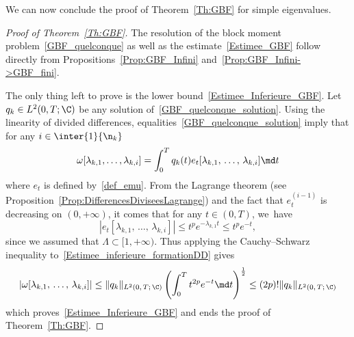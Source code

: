 We can now conclude the proof of Theorem~\ref{Th:GBF} for simple eigenvalues.
\begin{proof}[Proof of Theorem~\ref{Th:GBF}]
The resolution of the block moment problem~\eqref{GBF_quelconque} as well as the estimate~\eqref{Estimee_GBF} follow directly from Propositions~\ref{Prop:GBF_Infini} and~\ref{Prop:GBF_Infini->GBF_fini}.

The only thing left to prove is the lower bound~\eqref{Estimee_Inferieure_GBF}. Let $q_k \in L^2(0,T;\C)$ be any solution of~\eqref{GBF_quelconque_solution}. Using the linearity of divided differences, equalities~\eqref{GBF_quelconque_solution} imply that for any $i \in \inter{1}{\n_k}$
\begin{equation}\label{Estimee_inferieure_formationDD}
\omega[\lambda_{k,1}, \dots, \lambda_{k,i}] = \int_0^T q_k(t) e_t[\lambda_{k,1},\,\dots,\, \lambda_{k,i}] \md t
\end{equation}
where $e_t$ is defined by~\eqref{def_emu}. From the Lagrange theorem (see Proposition~\ref{Prop:DifferencesDiviseesLagrange}) and the fact that $e_t^{(i-1)}$ is decreasing on $(0,+\infty)$, it comes that for any $t \in (0,T)$, we~have
\[
\left| e_t[\lambda_{k,1},\,\dots,\, \lambda_{k,i}] \right|\leq t^p e^{-\lambda_{k,1} t} \leq t^p e^{-t},
\]
since we assumed that $\Lambda\subset [1,+\infty)$. Thus applying the Cauchy--Schwarz inequality to~\eqref{Estimee_inferieure_formationDD} gives
\[
\left| \omega[\lambda_{k,1},\,\dots,\, \lambda_{k,i}] \right| \leq \| q_k \|_{L^2(0,\,T;\,\C)} \left(\int_0^T t^{2p} e^{-t} \md t\right)^{\frac{1}{2}} \leq (2p)! \| q_k \|_{L^2(0,\,T;\,\C)}
\]
which proves~\eqref{Estimee_Inferieure_GBF} and ends the proof of Theorem~\ref{Th:GBF}.
\end{proof}



